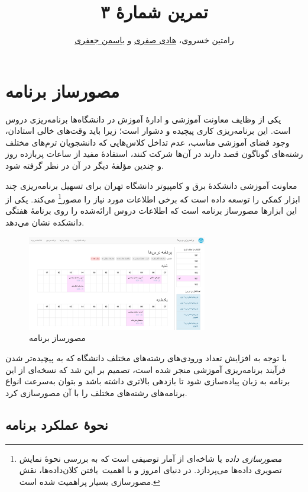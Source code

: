 \documentclass{utap}
\title{تمرین شمارهٔ ۳}
\author{رامتین خسروی، \href{mailto:hadi.safari@ut.ac.ir?subject=[AP\%20S98 A3]\%20}{هادی صفری} و \href{mailto:ys.jafari@ut.ac.ir?subject=[AP\%20S98 A3]\%20}{یاسمن جعفری}}
\begin{document}
    \maketitle

    \section{مصورساز برنامه}

    یکی از وظایف معاونت آموزشی و ادارهٔ آموزش در دانشگاه‌ها برنامه‌ریزی دروس است. این برنامه‌ریزی کاری پیچیده و دشوار است؛ زیرا باید وقت‌های خالی استادان، وجود فضای آموزشی مناسب، عدم تداخل کلاس‌هایی که دانشجویان ترم‌های مختلف رشته‌های گوناگون قصد دارند در آن‌ها شرکت کنند، استفادهٔ مفید از ساعات پربازده روز و چندین مؤلفهٔ دیگر در آن در نظر گرفته شود.

    معاونت آموزشی دانشکدهٔ برق و کامپیوتر دانشگاه تهران برای تسهیل برنامه‌ریزی چند ابزار کمکی را توسعه داده است که برخی اطلاعات مورد نیاز را مصور\footnote{\textit{مصورسازی داده} یا  شاخه‌ای از آمار توصیفی است که به بررسی نحوهٔ نمایش تصویری داده‌ها می‌پردازد. در دنیای امروز و با اهمیت~یافتن کلان‌داده‌ها، نقش مصورسازی بسیار پراهمیت شده است.} می‌کند. یکی از این ابزارها مصورساز برنامه است که اطلاعات دروس ارائه‌شده را روی برنامهٔ هفتگی دانشکده نشان می‌دهد.

    \begin{figure}[hb]
        \centering
        \includegraphics[width=0.7\textwidth]{webversion.png}
        \caption{مصورساز برنامه}
    \end{figure}

    با توجه به افزایش تعداد ورودی‌های رشته‌های مختلف دانشگاه که به پیچیده‌تر شدن فرآیند برنامه‌ریزی آموزشی منجر شده است، تصمیم بر این شد که نسخه‌ای از این برنامه به زبان  پیاده‌سازی شود تا بازدهی بالاتری داشته باشد و بتوان به‌سرعت انواع برنامه‌های رشته‌های مختلف را با آن مصورسازی کرد.

    \subsection{نحوهٔ عملکرد برنامه}
\end{document}
